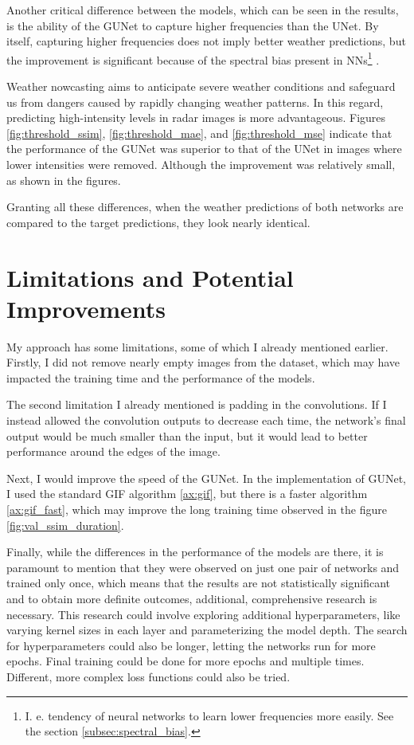 Another critical difference between the models, which can be seen in the results, is the ability of the \gls{GUNet} to capture higher frequencies than the UNet. By itself, capturing higher frequencies does not imply better weather predictions, but the improvement is significant because of the spectral bias present in \glspl{NN}\footnote{I. e. tendency of neural networks to learn lower frequencies more easily. See the section \ref{subsec:spectral_bias}.} .

Weather nowcasting aims to anticipate severe weather conditions and safeguard us from dangers caused by rapidly changing weather patterns. In this regard, predicting high-intensity levels in radar images is more advantageous. Figures \ref{fig:threshold_ssim}, \ref{fig:threshold_mae}, and \ref{fig:threshold_mse} indicate that the performance of the \gls{GUNet} was superior to that of the UNet in images where lower intensities were removed. Although the improvement was relatively small, as shown in the figures.

Granting all these differences, when the weather predictions of both networks are compared to the target predictions, they look nearly identical.

\section{Limitations and Potential Improvements}
\label{sec:limitations_improvements}

My approach has some limitations, some of which I already mentioned earlier. Firstly, I did not remove nearly empty images from the dataset, which may have impacted the training time and the performance of the models.

The second limitation I already mentioned is padding in the convolutions. If I instead allowed the convolution outputs to decrease each time, the network's final output would be much smaller than the input, but it would lead to better performance around the edges of the image.

Next, I would improve the speed of the GUNet. In the implementation of \gls{GUNet}, I used the standard \gls{GIF} algorithm \ref{ax:gif}, but there is a faster algorithm \ref{ax:gif_fast}, which may improve the long training time observed in the figure \ref{fig:val_ssim_duration}.

Finally, while the differences in the performance of the models are there, it is paramount to mention that they were observed on just one pair of networks and trained only once, which means that the results are not statistically significant and to obtain more definite outcomes, additional, comprehensive research is necessary. This research could involve exploring additional hyperparameters, like varying kernel sizes in each layer and parameterizing the model depth. The search for hyperparameters could also be longer, letting the networks run for more epochs. Final training could be done for more epochs and multiple times. Different, more complex loss functions could also be tried.


